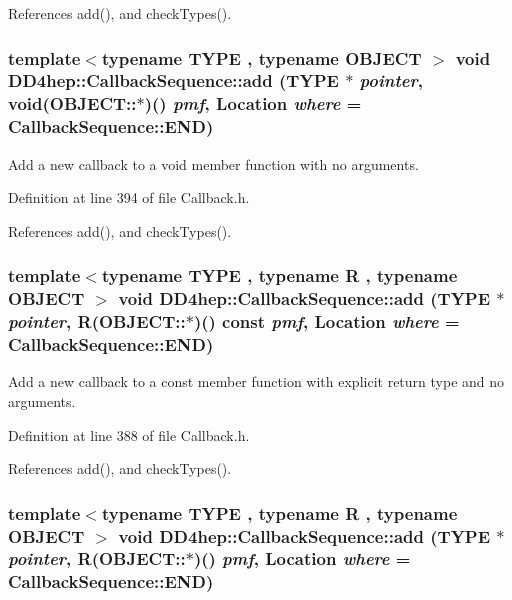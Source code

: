 References add(), and checkTypes().\hypertarget{struct_d_d4hep_1_1_callback_sequence_a032881e6a1d22611ffed927b6847a6be}{
\subsubsection[{add}]{\setlength{\rightskip}{0pt plus 5cm}template$<$typename TYPE , typename OBJECT $>$ void DD4hep::CallbackSequence::add (TYPE $\ast$ {\em pointer}, \/  void(OBJECT::$\ast$)() {\em pmf}, \/  {\bf Location} {\em where} = {\ttfamily CallbackSequence::END})}}
\label{struct_d_d4hep_1_1_callback_sequence_a032881e6a1d22611ffed927b6847a6be}


Add a new callback to a void member function with no arguments. 

Definition at line 394 of file Callback.h.

References add(), and checkTypes().\hypertarget{struct_d_d4hep_1_1_callback_sequence_a75e9d2323c3ceffbedd940b089d9a279}{
\subsubsection[{add}]{\setlength{\rightskip}{0pt plus 5cm}template$<$typename TYPE , typename R , typename OBJECT $>$ void DD4hep::CallbackSequence::add (TYPE $\ast$ {\em pointer}, \/  R(OBJECT::$\ast$)() const  {\em pmf}, \/  {\bf Location} {\em where} = {\ttfamily CallbackSequence::END})}}
\label{struct_d_d4hep_1_1_callback_sequence_a75e9d2323c3ceffbedd940b089d9a279}


Add a new callback to a const member function with explicit return type and no arguments. 

Definition at line 388 of file Callback.h.

References add(), and checkTypes().\hypertarget{struct_d_d4hep_1_1_callback_sequence_aa230d1d7e0c5a15b469a8997c90d738c}{
\subsubsection[{add}]{\setlength{\rightskip}{0pt plus 5cm}template$<$typename TYPE , typename R , typename OBJECT $>$ void DD4hep::CallbackSequence::add (TYPE $\ast$ {\em pointer}, \/  R(OBJECT::$\ast$)() {\em pmf}, \/  {\bf Location} {\em where} = {\ttfamily CallbackSequence::END})}}
\label{struct_d_d4hep_1_1_callback_sequence_aa230d1d7e0c5a15b469a8997c90d738c}



